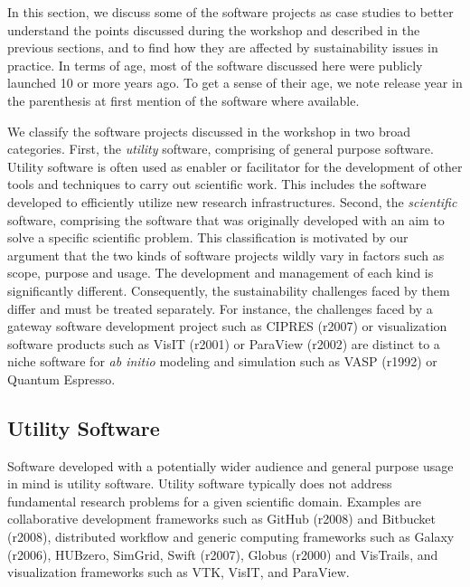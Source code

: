 \documentclass[11pt, oneside]{amsart}
\newcommand{\note}[1]{ {\textcolor{red}    { #1 }}}
\newcommand{\toolname}[1] {\textsf{#1}}
\begin{document}
In this section, we discuss some of the software projects as case
studies to better understand the points discussed during the workshop
and described in the previous sections, and to find how 
they are affected by sustainability issues in
practice. 
%
In terms of age, most of the software discussed here were publicly launched 10
or more years ago. To get a sense of their age, we note release year in the
parenthesis at first mention of the software where available.

We classify the software projects discussed in the workshop in two
broad categories. First, the \emph{utility} software, comprising of
general purpose software. Utility software is often used as enabler
or facilitator for the development of other tools and techniques
to carry out scientific work. This includes the software developed to
efficiently utilize new research infrastructures. Second, the
\emph{scientific} software, comprising the software that was
originally developed with an aim to solve a specific scientific
problem.
%
This classification is motivated by our argument that the two kinds of software
projects wildly vary in factors such as scope, purpose and usage. The
development and management of each kind is significantly different.
Consequently, the sustainability challenges faced by them differ and must be
treated separately. For instance, the challenges faced by a gateway software
development project such as \toolname{CIPRES (r2007)} or visualization software
products such as \toolname{VisIT (r2001)} or \toolname{ParaView (r2002)} are
distinct to a niche software for \textit{ab initio} modeling and simulation
such as \toolname{VASP (r1992)} or \toolname{Quantum Espresso}. %

\subsection{Utility Software}
Software developed with a potentially wider audience and general purpose usage
in mind is utility software. Utility software typically does not address
fundamental research problems for a given scientific domain. Examples are
collaborative development frameworks such as \toolname{GitHub (r2008)} and
\toolname{Bitbucket (r2008)}, distributed workflow and generic computing
frameworks such as \toolname{Galaxy (r2006)}, \toolname{HUBzero},
\toolname{SimGrid}, \toolname{Swift (r2007)}, \toolname{Globus (r2000)} and
\toolname{VisTrails}, and visualization frameworks such as \toolname{VTK},
\toolname{VisIT}, and \toolname{ParaView}.
\end{document}
